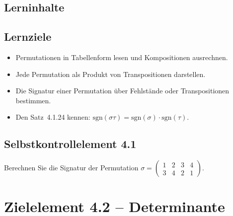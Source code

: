 \documentclass[a4paper,12pt]{article}
\begin{document}
\subsection*{Lerninhalte}
\begin{center}
\end{center}

\subsection*{Lernziele}
\begin{itemize}
  \item Permutationen in Tabellenform lesen und Kompositionen ausrechnen.
  \item Jede Permutation als Produkt von Transpositionen darstellen.
  \item Die Signatur einer Permutation über Fehlstände oder Transpositionen bestimmen.
  \item Den Satz~4.1.24 kennen: $\mathrm{sgn}(\sigma \tau) = \mathrm{sgn}(\sigma)\cdot\mathrm{sgn}(\tau)$.
\end{itemize}

\subsection*{Selbstkontrollelement 4.1}
Berechnen Sie die Signatur der Permutation $\sigma = \begin{pmatrix}1&2&3&4\\3&4&2&1\end{pmatrix}$.

\newpage

\section*{Zielelement 4.2 -- Determinante}
\end{document}
